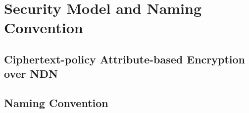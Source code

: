 \section{Security Model and Naming Convention}

\subsection{Ciphertext-policy Attribute-based Encryption over NDN}

\subsection{Naming Convention}
